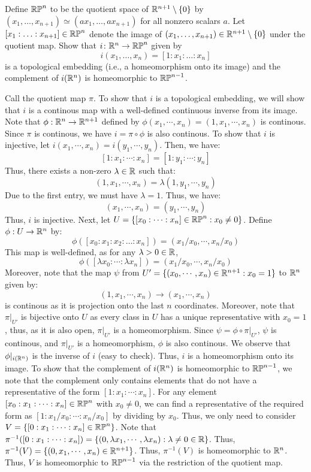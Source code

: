 \documentclass[12pt]{article}
\begin{document}
\begin{problab}{3}
Define $\mathbb{RP}^n$ to be the quotient space of $\mathbb R^{n+1}\setminus \{0\}$ by $(x_1, \hdots, x_{n+1}) \simeq (a x_1, \hdots, a x_{n+1})$ for all nonzero scalars $a$. Let $[x_1: \hdots : x_{n+1}] \in \mathbb{RP}^n$ denote the image of $(x_1, \hdots, x_{n+1}) \in \mathbb{R}^{n+1} \setminus \{ 0 \}$ under the quotient map. Show that $i \colon \mathbb{R}^n \to \mathbb{RP}^n$ given by 
$$ i (x_1, \hdots, x_n) = [1: x_1 : \hdots : x_n ] $$
is a topological embedding (i.e., a homeomorphism onto its image) and the complement of $i(\mathbb{R}^n)$ is homeomorphic to $\mathbb{RP}^{n-1}$.
\end{problab}

\begin{solu}
    Call the quotient map $\pi$. To show that $i$ is a topological embedding, we will show that $i$ is a continous map with a well-defined continuous inverse from its image. \bbni 
    Note that $\phi: \mathbb R^n \to \mathbb R^{n+1}$ defined by $\phi(x_1, \cdots, x_n) = (1, x_1, \cdots, x_n)$ is continous. Since $\pi$ is continous, we have $i = \pi \circ \phi$ is also continous.  \bbni
    To show that $i$ is injective, let $i(x_1, \cdots, x_n) = i(y_1, \cdots, y_n)$. Then, we have:
    \[ [1 : x_1 : \cdots : x_n] = [1 : y_1 : \cdots : y_n] \]
    Thus, there exists a non-zero $\lambda \in \mathbb R$ such that:
    \[ (1, x_1, \cdots, x_n) = \lambda(1, y_1, \cdots, y_n) \]
    Due to the first entry, we must have $\lambda = 1$. Thus, we have:
    \[ (x_1, \cdots, x_n) = (y_1, \cdots, y_n) \]
    Thus, $i$ is injective. Next, let $U = \{[x_0 : \cdots : x_n] \in \mathbb{RP}^n : x_0 \neq 0 \}$. Define $\phi: U \to \mathbb R^n$ by: 
    \[ \phi([x_0 : x_1: x_2: \hdots : x_{n}]) = (x_1/x_0, \cdots, x_{n}/x_0) \]
    This map is well-defined, as for any $\lambda > 0 \in \mathbb R$, 
    \[ \phi([\lambda x_0 : \cdots : \lambda x_n]) = (x_1/x_0, \cdots, x_{n}/x_0) \]
    Moreover, note that the map $\psi$ from $U' = \{(x_0, \cdots, x_n) \in \mathbb R^{n+1} : x_0 = 1\}$ to $\mathbb R^n$ given by:
    \[ (1, x_1, \cdots, x_n) \to (x_1, \cdots, x_{n}) \]
    is continous as it is projection onto the last $n$ coordinates. Moreover, note that $\pi|_{U'}$ is bijective onto $U$ as every class in $U$ has a unique representative with $x_0 = 1$, thus, as it is also open, $\pi|_{U'}$ is a homeomorphism. Since $\psi = \phi \circ \pi|_{U'}$, $\psi$ is continous, and $\pi|_{U'}$ is a homeomorphism, $\phi$ is also continous. \bbni 
    We observe that $\phi|_{i(\mathbb R^n)}$ is the inverse of $i$ (easy to check). Thus, $i$ is a homeomorphism onto its image. \bbni
    To show that the complement of $i(\mathbb R^n)$ is homeomorphic to $\mathbb{RP}^{n-1}$, we note that the complement only contains elements that do not have a representative of the form $[1 : x_1 : \cdots : x_n]$. For any element $[x_0 : x_1 : \cdots : x_n] \in \mathbb{RP}^n$ with $x_0 \neq 0$, we can find a representative of the required form as $[1 : x_1/x_0 : \cdots : x_n/x_0]$ by dividing by $x_0$. Thus, we only need to consider $V = \{[0 : x_1 : \cdots : x_n] \in \mathbb{RP}^n\}$. Note that $\pi^{-1}([0 : x_1 : \cdots : x_n]) = \{ (0, \lambda x_1, \cdots, \lambda x_n) : \lambda \neq 0 \in \mathbb R\}$. Thus, $\pi^{-1}(V) = \{(0, x_1, \cdots, x_n) \in \mathbb R^{n+1}\}$. Thus, $\pi^{-1}(V)$ is homeomorphic to $\mathbb R^n$. Thus, $V$ is homeomorphic to $\mathbb{RP}^{n-1}$ via the restriction of the quotient map.

\end{solu}
\end{document}
